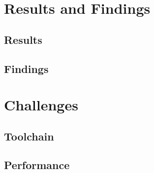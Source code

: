 \documentclass[12pt]{article}
\begin{document}
    \pagebreak


    \section{Results and Findings}\label{sec:results-and-findings}


    \subsection{Results}\label{subsec:results}


    \subsection{Findings}\label{subsec:findings}


    \pagebreak


    \section{Challenges}\label{sec:challenges}

    \subsection{Toolchain}\label{subsec:toolchain2}


    \subsection{Performance}\label{subsec:performance}

\end{document}

